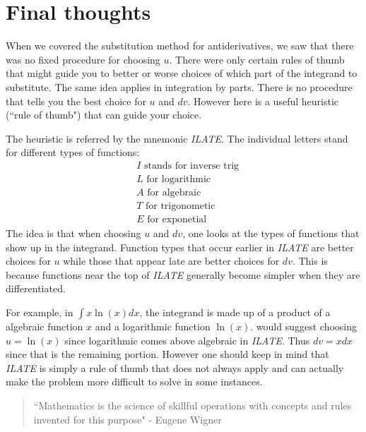 \documentclass[noauthor]{ximera}
\begin{document}

\section{Final thoughts}
When we covered the substitution method for antiderivatives, we saw that there was no fixed procedure for choosing $u$. There were only certain rules of thumb that might guide you to better or worse choices of which part of the integrand to substitute. The same idea applies in integration by parts. There is no procedure that tells you the best choice for $u$ and $dv$. However here is a useful heuristic (``rule of thumb") that can guide your choice. 

The heuristic is referred by the mnemonic \textit{ILATE}.  The individual letters stand for different types of functions: 
\begin{align}
&I \text{  stands for inverse trig} \\ 
&L \text{  for logarithmic} \\
&A \text{  for algebraic} \\
&T \text{  for trigonometic} \\
&E \text{  for exponetial}
\end{align}
The idea is that when choosing $u$ and $dv$, one looks at the types of functions that show up in the integrand. Function types that occur earlier in \textit{ILATE} are better choices for $u$ while those that appear late are better choices for $dv$. This is because functions near the top of  \textit{ILATE} generally become simpler when they are differentiated. 

For example, in $\int x \ln(x) dx$, the integrand is made up of a product of a algebraic function $x$ and a logarithmic function $\ln(x)$.    would suggest choosing $u=\ln(x)$ since logarithmic comes above algebraic in \textit{ILATE}. Thus $dv=x dx$ since that is the remaining portion. However one should keep in mind that \textit{ILATE} is simply a rule of thumb that does not always apply and can actually make the problem more difficult to solve in some instances. 

\begin{quote}
``Mathematics is the science of skillful operations with concepts and rules invented for this purpose" - Eugene Wigner
\end{quote}
\end{document}
